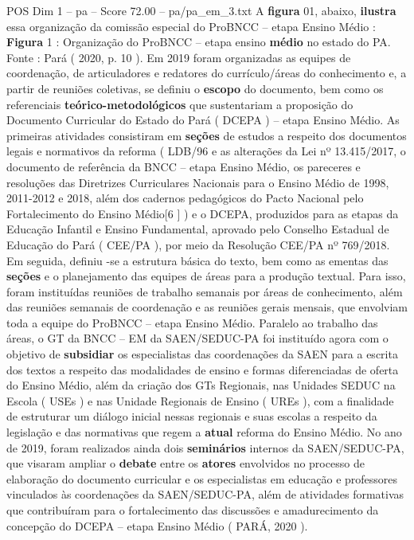 \begin{textsample}{POS Dim 1 – pa – Score 72.00 – pa/pa\_em\_3.txt}
A \textbf{figura} 01, abaixo, \textbf{ilustra} essa organização da comissão especial do ProBNCC – etapa Ensino Médio : \textbf{Figura} 1 : Organização do ProBNCC – etapa ensino \textbf{médio} no estado do PA.
Fonte : Pará ( 2020, p. 10 ).
Em 2019 foram organizadas as equipes de coordenação, de articuladores e redatores do currículo/áreas do conhecimento e, a partir de reuniões coletivas, se definiu o \textbf{escopo} do documento, bem como os referenciais \textbf{teórico-metodológicos} que sustentariam a proposição do Documento Curricular do Estado do Pará ( DCEPA ) – etapa Ensino Médio.
As primeiras atividades consistiram em \textbf{seções} de estudos a respeito dos documentos legais e normativos da reforma ( LDB/96 e as alterações da Lei nº 13.415/2017, o documento de referência da BNCC – etapa Ensino Médio, os pareceres e resoluções das Diretrizes Curriculares Nacionais para o Ensino Médio de 1998, 2011-2012 e 2018, além dos cadernos pedagógicos do Pacto Nacional pelo Fortalecimento do Ensino Médio[6 ] ) e o DCEPA, produzidos para as etapas da Educação Infantil e Ensino Fundamental, aprovado pelo Conselho Estadual de Educação do Pará ( CEE/PA ), por meio da Resolução CEE/PA nº 769/2018.
Em seguida, definiu -se a estrutura básica do texto, bem como as ementas das \textbf{seções} e o planejamento das equipes de áreas para a produção textual.
Para isso, foram instituídas reuniões de trabalho semanais por áreas de conhecimento, além das reuniões semanais de coordenação e as reuniões gerais mensais, que envolviam toda a equipe do ProBNCC – etapa Ensino Médio.
Paralelo ao trabalho das áreas, o GT da BNCC – EM da SAEN/SEDUC-PA foi instituído agora com o objetivo de \textbf{subsidiar} os especialistas das coordenações da SAEN para a escrita dos textos a respeito das modalidades de ensino e formas diferenciadas de oferta do Ensino Médio, além da criação dos GTs Regionais, nas Unidades SEDUC na Escola ( USEs ) e nas Unidade Regionais de Ensino ( UREs ), com a finalidade de estruturar um diálogo inicial nessas regionais e suas escolas a respeito da legislação e das normativas que regem a \textbf{atual} reforma do Ensino Médio.
No ano de 2019, foram realizados ainda dois \textbf{seminários} internos da SAEN/SEDUC-PA, que visaram ampliar o \textbf{debate} entre os \textbf{atores} envolvidos no processo de elaboração do documento curricular e os especialistas em educação e professores vinculados às coordenações da SAEN/SEDUC-PA, além de atividades formativas que contribuíram para o fortalecimento das discussões e amadurecimento da concepção do DCEPA – etapa Ensino Médio ( PARÁ, 2020 ).

\end{textsample}
